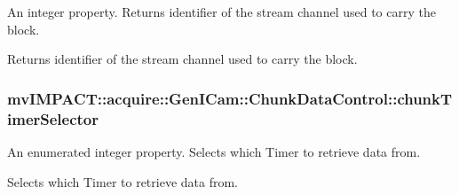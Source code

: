 An integer property. Returns identifier of the stream channel used to carry the block. 

Returns identifier of the stream channel used to carry the block. \hypertarget{classmv_i_m_p_a_c_t_1_1acquire_1_1_gen_i_cam_1_1_chunk_data_control_ae64defa82d79e8cc3b38aa6ff2c5e31a}{
\subsubsection[{chunk\+Timer\+Selector}]{ mv\+I\+M\+P\+A\+C\+T\+::acquire\+::\+Gen\+I\+Cam\+::\+Chunk\+Data\+Control\+::chunk\+Timer\+Selector}}\label{classmv_i_m_p_a_c_t_1_1acquire_1_1_gen_i_cam_1_1_chunk_data_control_ae64defa82d79e8cc3b38aa6ff2c5e31a}


An enumerated integer property. Selects which Timer to retrieve data from. 

Selects which Timer to retrieve data from.

